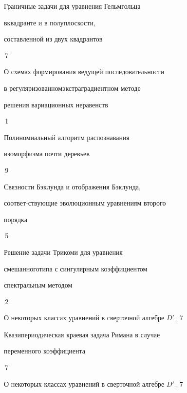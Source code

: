 

{Граничные задачи для уравнения Гельмгольца


в\newline квадранте и в полуплоскости,


составленной из двух квадрантов}{\No\,7}




{О схемах формирования ведущей последовательности 


в регуляризованном\newline экстраградиентном методе


решения вариационных неравенств}{\No\,1}







{Полиномиальный алгоритм распознавания


изоморфизма почти деревьев}{\No\,9}




{Связности Бэклунда и отображения Бэклунда,


соответ-\newline ствующие эволюционным уравнениям второго


порядка}{\No\,5}










{Решение задачи Трикоми для уравнения


смешанного\newline типа с сингулярным коэффициентом


спектральным методом}{\No\,2}




{О некоторых классах уравнений в сверточной алгебре $D'_+$}{\No\,7}




{Квазипериодическая краевая задача Римана в случае\newline  


переменного коэффициента}{\No\,7}




{О некоторых классах уравнений в сверточной алгебре $D'_+$}{\No\,7}




